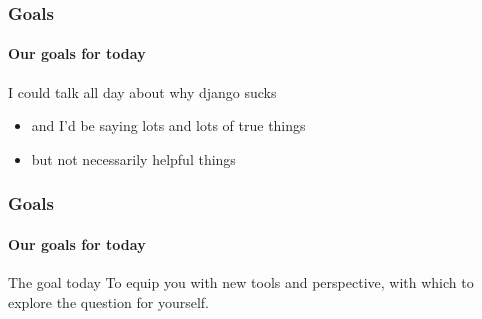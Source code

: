 \begin{frame}
\frametitle{Goals}
\framesubtitle{Our goals for today}
\begin{block}{I could talk all day about why django sucks}
\begin{itemize}
\item<1> and I'd be saying lots and lots of true things
\item<2> but not necessarily helpful things
\end{itemize}
\end{block}
\end{frame}


\begin{frame}
\frametitle{Goals}
\framesubtitle{Our goals for today}
\begin{block}{The goal today}
To equip you with new tools and perspective, with which to explore the question for yourself.
\end{block}
\end{frame}